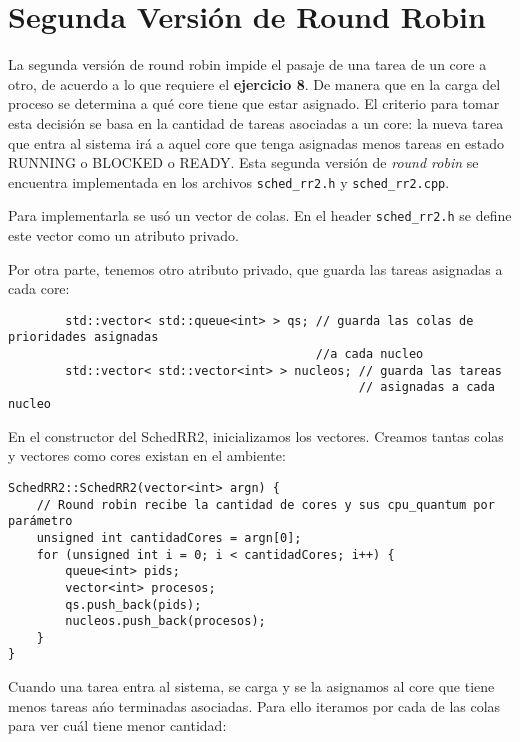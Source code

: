 \section{Segunda Versi\'on de Round Robin}

La segunda versi\'on de round robin impide el pasaje de una tarea de un core a otro, de acuerdo a lo que requiere el \textbf{ejercicio 8}. De manera que en la carga del proceso se determina a qu\'e core tiene que estar asignado. El criterio para tomar esta decisi\'on se basa en la cantidad de tareas asociadas a un core: la nueva tarea que entra al sistema ir\'a a aquel core que tenga asignadas menos tareas en estado RUNNING o BLOCKED o READY.
Esta segunda versi\'on de \textit{round robin} se encuentra implementada en los archivos \verb+sched_rr2.h+ y \verb+sched_rr2.cpp+.

Para implementarla se us\'o un vector de colas. En el header \verb+sched_rr2.h+ se define este vector como un atributo privado.

Por otra parte, tenemos otro atributo privado, que guarda las tareas asignadas a cada core:

\begin{verbatim}
        std::vector< std::queue<int> > qs; // guarda las colas de prioridades asignadas 
                                           //a cada nucleo
        std::vector< std::vector<int> > nucleos; // guarda las tareas 
                                                 // asignadas a cada nucleo
\end{verbatim}

En el constructor del SchedRR2, inicializamos los vectores. Creamos tantas colas y vectores como cores existan en el ambiente:

\begin{verbatim}
SchedRR2::SchedRR2(vector<int> argn) {
	// Round robin recibe la cantidad de cores y sus cpu_quantum por parámetro
    unsigned int cantidadCores = argn[0];
    for (unsigned int i = 0; i < cantidadCores; i++) {
        queue<int> pids;
        vector<int> procesos;
        qs.push_back(pids);
        nucleos.push_back(procesos);
    }
}

\end{verbatim}

Cuando una tarea entra al sistema, se carga y se la asignamos al core que tiene menos tareas a\'no terminadas asociadas. Para ello iteramos por cada de las colas para ver cu\'al tiene menor cantidad:

